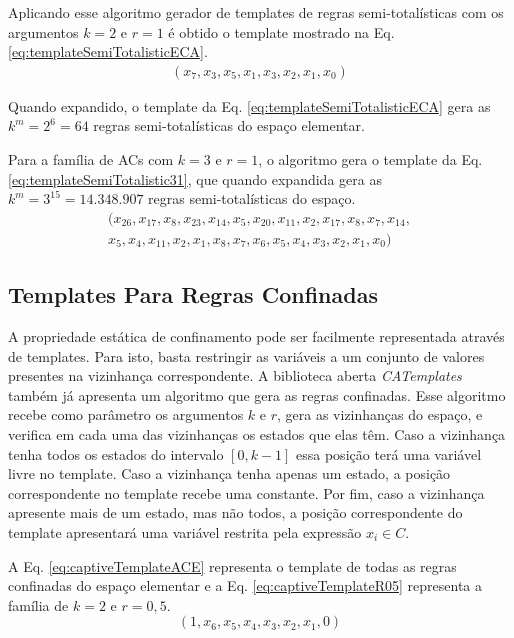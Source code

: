 Aplicando esse algoritmo gerador de templates de regras semi-totalísticas com os argumentos $k=2$ e $r=1$ é obtido o template mostrado na Eq. \eqref{eq:templateSemiTotalisticECA}.
\begin{equation}
\begin{split}
(x_7,x_3,x_5,x_1,x_3,x_2,x_1,x_0)
\label{eq:templateSemiTotalisticECA}
\end{split}
\end{equation}

Quando expandido, o template da Eq. \eqref{eq:templateSemiTotalisticECA} gera as $k^m = 2^6 = 64$ regras semi-totalísticas do espaço elementar.

Para a família de ACs com $k=3$ e $r=1$, o algoritmo gera o template da Eq. \eqref{eq:templateSemiTotalistic31}, que quando expandida gera as $k^m = 3^{15} = 14.348.907$ regras semi-totalísticas do espaço.
\begin{equation}
\begin{split}
(x_{26},x_{17},x_8,x_{23},x_{14},x_5,x_{20},x_{11},x_2,x_{17},x_8,x_7,x_{14},\\
x_5,x_4,x_{11},x_2,x_1,x_8,x_7,x_6,x_5,x_4,x_3,x_2,x_1,x_0)
\label{eq:templateSemiTotalistic31}
\end{split}
\end{equation}

\subsection{Templates Para Regras Confinadas}
A propriedade estática de confinamento pode ser facilmente representada através de templates. Para isto, basta restringir as variáveis a um conjunto de valores presentes na vizinhança correspondente. A biblioteca aberta \textit{CATemplates} também já apresenta um algoritmo que gera as regras confinadas. Esse algoritmo recebe como parâmetro os argumentos $k$ e $r$, gera as vizinhanças do espaço, e verifica em cada uma das vizinhanças os estados que elas têm. Caso a vizinhança tenha todos os estados do intervalo $[0, k-1]$ essa posição terá uma variável livre no template. Caso a vizinhança tenha apenas um estado, a posição correspondente no template recebe uma constante. Por fim, caso a vizinhança apresente mais de um estado, mas não todos, a posição correspondente do template apresentará uma variável restrita pela expressão $x_i \in C$.

A Eq. \eqref{eq:captiveTemplateACE} representa o template de todas as regras confinadas do espaço elementar e a Eq. \eqref{eq:captiveTemplateR05} representa a família de $k=2$ e $r=0,5$.
\begin{equation}
(1,x_6,x_5,x_4,x_3,x_2,x_1,0)
\label{eq:captiveTemplateACE}
\end{equation}

